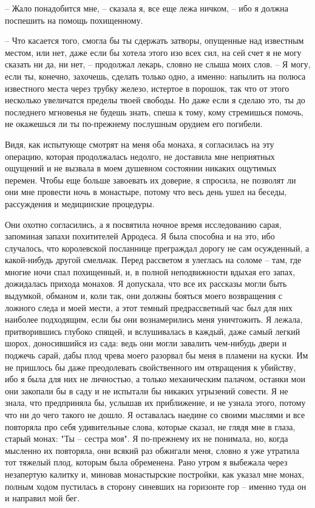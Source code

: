 -- Жало понадобится мне, -- сказала я, все еще лежа ничком,  --  ибо  я
должна поспешить на помощь похищенному.

-- Что  касается  того,  смогла  бы  ты сдержать затворы, опущенные над
известным местом, или нет, даже если бы хотела этого изо всех  сил,  на  сей
счет  я  не могу сказать ни да, ни нет, -- продолжал лекарь, словно не слыша
моих слов. -- Я могу, если ты, конечно, захочешь,  сделать  только  одно,  а
именно:  напылить на полюса известного места через трубку железо, истертое в
порошок, так что от этого несколько увеличатся  пределы  твоей  свободы.  Но
даже  если я сделаю это, ты до последнего мгновенья не будешь знать, спеша к
тому, кому стремишься помочь,  не  окажешься  ли  ты  по-прежнему  послушным
орудием его погибели.

Видя,  как  испытующе  смотрят на меня оба монаха, я согласилась на эту
операцию, которая продолжалась недолго, не доставила мне неприятных ощущений
и не вызвала в моем душевном состоянии никаких ощутимых перемен.  Чтобы  еще
больше  завоевать  их  доверие,  я спросила, не позволят ли они мне провести
ночь в монастыре, потому  что  весь  день  ушел  на  беседы,  рассуждения  и
медицинские процедуры.

Они  охотно согласились, а я посвятила ночное время исследованию сарая,
запоминая запахи похитителей  Арродеса.  Я  была  способна  и  на  это,  ибо
случалось, что королевской посланнице преграждал дорогу не сам осужденный, а
какой-нибудь  другой  смельчак. Перед рассветом я улеглась на соломе -- там,
где многие ночи спал похищенный, и, в полной неподвижности вдыхая его запах,
дожидалась прихода монахов. Я допускала, что  все  их  рассказы  могли  быть
выдумкой,  обманом  и,  коли  так,  они  должны  бояться моего возвращения с
ложного следа и моей мести, а этот темный предрассветный  час  был  для  них
наиболее  подходящим,  если  бы они вознамерились меня уничтожить. Я лежала,
притворившись глубоко спящей, и вслушивалась в  каждый,  даже  самый  легкий
шорох,  доносившийся  из  сада:  ведь  они могли завалить чем-нибудь двери и
поджечь сарай, дабы плод чрева моего разорвал бы меня в пламени на куски. Им
не пришлось бы даже преодолевать свойственного им отвращения к убийству, ибо
я была для них не личностью, а только механическим палачом, останки мои  они
закопали  бы  в саду и не испытали бы никаких угрызений совести. Я не знала,
что предприняла бы, услышав их приближение, и не узнала этого, потому что ни
до чего такого не дошло. Я  оставалась  наедине  со  своими  мыслями  и  все
повторяла про себя удивительные слова, которые сказал, не глядя мне в глаза,
старый  монах:  "Ты  -- сестра моя". Я по-прежнему их не понимала, но, когда
мысленно их повторяла, они всякий раз обжигали меня, словно я  уже  утратила
тот  тяжелый  плод,  которым  была  обременена.  Рано утром я выбежала через
незапертую калитку и, миновав монастырские постройки, как указал мне  монах,
полным ходом пустилась в сторону синевших на горизонте гор -- именно туда он
и направил мой бег.


